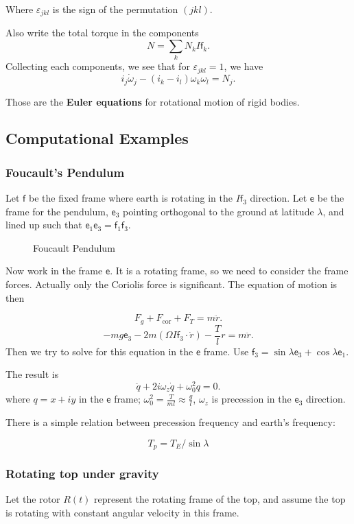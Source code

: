 Where $\varepsilon_{jkl}$ is the sign of the permutation $(jkl)$. 

Also write the total torque in the components
\[
	N = \sum_k N_k I\mathsf{f}_k
.\] 
Collecting each components, we see that for $\varepsilon_{jkl} = 1$, we have
\[
	i_j \dot\omega_j - (i_k - i_l) \omega_k \omega_l = N_j
.\] 

Those are the \textbf{Euler equations} for rotational motion of rigid bodies.

\subsection{Computational Examples}

\subsubsection{Foucault's Pendulum}

Let $\mathsf{f}$ be the fixed frame where earth is rotating in the $I\mathsf{f}_3$ direction. Let $\mathsf{e}$ be the frame for the pendulum, $\mathsf{e}_3$ pointing orthogonal to the ground at latitude $\lambda$, and lined up such that $\mathsf{e}_1 \mathsf{e}_3 = \mathsf{f}_1 \mathsf{f}_3$.

\begin{figure}[ht]
    \centering
    \caption{Foucault Pendulum}
    \label{fig:foucault-pendulum}
\end{figure}

Now work in the frame $\mathsf{e}$. It is a rotating frame, so we need to consider the frame forces. Actually only the Coriolis force is significant. The equation of motion is then

\[
	F_g + F_{\text{cor}} + F_T = m \ddot{r} 
.\] 
\[
	- m g \mathsf{e}_3 - 2 m (\Omega I \mathsf{f}_3 \cdot \dot{r}) - \frac{T}{l} r = m \ddot{r} 
.\] 
Then we try to solve for this equation in the $\mathsf{e}$ frame. Use $\mathsf{f}_3 = \sin \lambda \mathsf{e}_3 + \cos \lambda \mathsf{e}_1$.

The result is
\[
	\ddot{q}+2 i \omega_z \dot{q}+\omega_0^2 q=0
.\] 
where $q = x + i y$ in the $\mathsf{e}$ frame; $\omega_0^2 = \frac{T}{m l }\approx \frac{g}{l}$, $\omega_z$ is precession in the $\mathsf{e}_3$ direction.

There is a simple relation between precession frequency and earth's frequency:

\[
	T_p=T_E / \sin \lambda
\]

\subsubsection{Rotating top under gravity}
Let the rotor $R(t)$ represent the rotating frame of the top, and assume the top is rotating with constant angular velocity in this frame.

